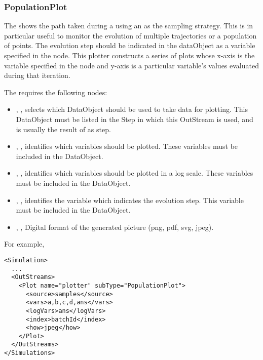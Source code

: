 \subsubsection{PopulationPlot}
The   shows the path taken during a  using
an  as the sampling strategy. This is in particular useful to monitor the evolution of multiple
trajectories or a population of points.
The evolution step should be indicated in the dataObject as a variable specified in the  node.
This plotter constructs a series of plots whose x-axis is the variable specified in the  node
and y-axis is a particular variable's values evaluated during that iteration.

The   requires the following nodes:
\begin{itemize}
  \item {}, , selects which DataObject should be used
      to take data for plotting. This DataObject must be listed in the Step in which this
      OutStream is used, and is usually the result of as  step.
  \item {}, , identifies which variables should
      be plotted. These variables must be included in the 
      DataObject.
  \item {}, , identifies which variables should
      be plotted in a log scale. These variables must be included in the 
      DataObject.
  \item {}, , identifies the variable which indicates
      the evolution step. This variable must be included in the  DataObject.
  \item {}, , Digital format of the generated picture (png, pdf, svg, jpeg).
\end{itemize}

For example,
\begin{lstlisting}[style=XML]
<Simulation>
  ...
  <OutStreams>
    <Plot name="plotter" subType="PopulationPlot">
      <source>samples</source>
      <vars>a,b,c,d,ans</vars>
      <logVars>ans</logVars>
      <index>batchId</index>
      <how>jpeg</how>
    </Plot>
  </OutStreams>
</Simulations>
\end{lstlisting}


